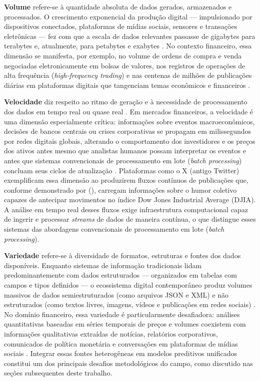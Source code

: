 \textbf{Volume} refere-se à quantidade absoluta de dados gerados, armazenados e processados. O crescimento exponencial da produção digital --- impulsionado por  dispositivos conectados, plataformas de mídias sociais, sensores e transações eletrônicas --- fez com que a escala de dados relevantes passasse de gigabytes para terabytes e, atualmente, para petabytes e exabytes \cite{chen2014bigdata}. No contexto financeiro, essa dimensão se manifesta, por exemplo, no volume de ordens de compra e venda negociadas eletronicamente em bolsas de valores, nos registros de operações de alta frequência (\textit{high-frequency trading}) e nas centenas de milhões de publicações diárias em plataformas digitais que tangenciam temas econômicos e financeiros \cite{bollen2011,ranco2015}.

\textbf{Velocidade} diz respeito ao ritmo de geração e à necessidade de processamento dos dados em tempo real ou quase real \cite{laney2001}. Em mercados financeiros, a velocidade é uma dimensão especialmente crítica: informações sobre eventos macroeconômicos, decisões de bancos centrais ou crises corporativas se propagam em milissegundos por redes digitais globais, alterando o comportamento dos investidores e os preços dos ativos antes mesmo que analistas humanos possam interpretar os eventos e antes que sistemas convencionais de processamento em lote (\textit{batch processing}) concluam seus ciclos de atualização \cite{chen2014bigdata}. Plataformas como o X (antigo Twitter) exemplificam essa dimensão ao produzirem fluxos contínuos de publicações que, conforme demonstrado por \citeauthor{bollen2011} (\citeyear{bollen2011}), carregam informações sobre o humor coletivo capazes de antecipar movimentos no índice Dow Jones Industrial Average (DJIA). A análise em tempo real desses fluxos exige infraestrutura computacional capaz de ingerir e processar \textit{streams} de dados de maneira contínua, o que distingue esses sistemas das abordagens convencionais de processamento em lote (\textit{batch processing}).

\textbf{Variedade} refere-se à diversidade de formatos, estruturas e fontes dos dados disponíveis. Enquanto sistemas de informação tradicionais lidam predominantemente com dados estruturados --- organizados em tabelas com campos e tipos definidos --- o ecossistema digital contemporâneo produz volumes massivos de dados semiestruturados (como arquivos JSON e XML) e não estruturados (como textos livres, imagens, vídeos e publicações em redes sociais) \cite{laney2001}. No domínio financeiro, essa variedade é particularmente desafiadora: análises quantitativas baseadas em séries temporais de preços e volumes coexistem com informações qualitativas extraídas de notícias, relatórios corporativos, comunicados de política monetária e conversações em plataformas de mídias sociais \cite{kearney2014}. Integrar essas fontes heterogêneas em modelos preditivos unificados constitui um dos principais desafios metodológicos do campo, como discutido nas seções subsequentes deste trabalho.

